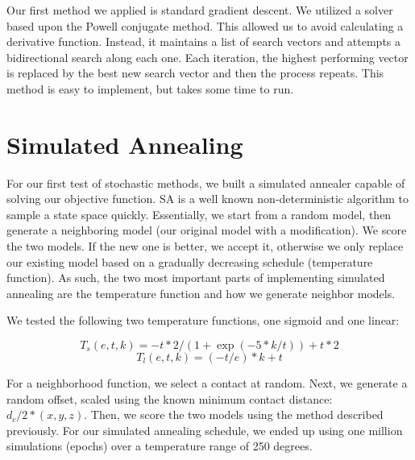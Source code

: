 \documentclass{article}
\begin{document}
Our first method we applied is standard gradient descent.  We utilized a solver based upon the Powell conjugate method.  This allowed us to avoid calculating a derivative function.  Instead, it maintains a list of search vectors and attempts a bidirectional search along each one.  Each iteration, the highest performing vector is replaced by the best new search vector and then the process repeats.  This method is easy to implement, but takes some time to run.

\section{Simulated Annealing}

For our first test of stochastic methods, we built a simulated annealer capable of solving our objective function.  SA is a well known non-deterministic algorithm to sample a state space quickly.  Essentially, we start from a random model, then generate a neighboring model (our original model with a modification).  We score the two models.  If the new one is better, we accept it, otherwise we only replace our existing model based on a gradually decreasing schedule (temperature function).  As such, the two most important parts of implementing simulated annealing are the temperature function and how we generate neighbor models.

We tested the following two temperature functions, one sigmoid and one linear:

\begin{equation}
      T_s(e,t,k) =  -t*2/(1 + \exp(-5*k/t)) + t*2
    \end{equation}
\begin{equation}
      T_l(e,t,k) =  (-t/e)*k + t
    \end{equation}
    
For a neighborhood function, we select a contact at random.  Next, we generate a random offset, scaled using the known minimum contact distance: $d_{c}/2*(x,y,z)$.  Then, we score the two models using the method described previously.  For our simulated annealing schedule, we ended up using one million simulations (epochs) over a temperature range of 250 degrees.
\end{document}
